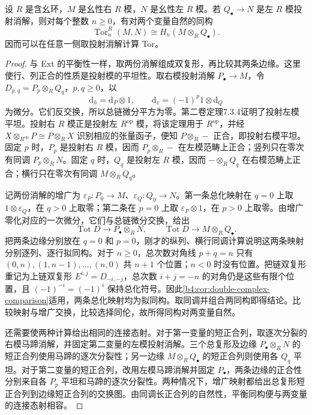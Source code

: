 \begin{theorem}\label{b4:thm:tor-balanced}
	设 \(R\) 是含幺环，\(M\) 是幺性右 \(R\) 模，\(N\) 是幺性左 \(R\) 模。若 \(Q_\bullet\to N\) 是左 \(R\) 模投射消解，则对每个整数 \(n\ge0\)，有对两个变量自然的同构
	\[
		\operatorname{Tor}_n^R(M,N)\cong H_n(M\otimes_RQ_\bullet).
	\]
	因而可以在任意一侧取投射消解计算 Tor。
\end{theorem}
\begin{proof}
	与 Ext 的平衡性一样，取两份消解组成双复形，再比较其两条边缘。这里使行、列正合的性质是投射模的平坦性。取右模投射消解 \(P_\bullet\to M\)，令 \(D_{p,q}=P_p\otimes_RQ_q\)，\(p,q\ge0\)，以
	\[
		\mathrm{d}_h=\mathrm{d}_P\otimes1,\qquad \mathrm{d}_v=(-1)^p1\otimes \mathrm{d}_Q
	\]
	为微分。它们反交换，所以总链微分平方为零。第二卷定理7.3.4证明了投射左模平坦。投射右 \(R\) 模正是投射左 \(R^{\mathrm{op}}\) 模，将该定理用于 \(R^{\mathrm{op}}\)，并经 \(X\otimes_{R^{\mathrm{op}}}P\cong P\otimes_RX\) 识别相应的张量函子，便知 \(P\otimes_R-\) 正合，即投射右模平坦。固定 \(p\) 时，\(P_p\) 是投射右 \(R\) 模，因而 \(P_p\otimes_R-\) 在左模范畴上正合；竖列只在零次有同调 \(P_p\otimes_RN\)。固定 \(q\) 时，\(Q_q\) 是投射左 \(R\) 模，因而 \(-\otimes_RQ_q\) 在右模范畴上正合；横行只在零次有同调 \(M\otimes_RQ_q\)。

	记两份消解的增广为 \(\varepsilon_P:P_0\to M\)、\(\varepsilon_Q:Q_0\to N\)。第一条总化映射在 \(q=0\) 上取 \(1\otimes\varepsilon_Q\)，在 \(q>0\) 上取零；第二条在 \(p=0\) 上取 \(\varepsilon_P\otimes1\)，在 \(p>0\) 上取零。由增广零化对应的一次微分，它们与总链微分交换，给出
	\[
		\operatorname{Tot}D\longrightarrow P_\bullet\otimes_RN, \qquad \operatorname{Tot}D\longrightarrow M\otimes_RQ_\bullet.
	\]
	把两条边缘分别放在 \(q=0\) 和 \(p=0\)，刚才的纵列、横行同调计算说明这两条映射分别逐列、逐行拟同构。对于 \(n\ge0\)，总次数对角线 \(p+q=n\) 只有 \((0,n),(1,n-1),\ldots,(n,0)\) 共 \(n+1\) 个位置；\(n<0\) 时没有位置。把链双复形重记为上链双复形 \(E^{i,j}=D_{-i,-j}\)，总次数 \(i+j=-n\) 的对角仍是这些有限个位置，且 \((-1)^{-i}=(-1)^i\) 保持总化符号。因此\cref{b4:cor:double-complex-comparison}适用，两条总化映射均为拟同构。取同调并组合两同构即得结论。比较映射与增广交换，比较选择同伦，故所得同构对两变量自然。

	还需要使两种计算给出相同的连接态射。对于第一变量的短正合列，取逐次分裂的右模马蹄消解，并固定第二变量的左模投射消解。三个总复形及边缘 \(P_\bullet\otimes_RN\) 的短正合列使用马蹄的逐次分裂性；另一边缘 \(M\otimes_RQ_\bullet\) 的短正合列则使用各 \(Q_q\) 平坦。对于第二变量的短正合列，改用左模马蹄消解并固定 \(P_\bullet\)，两条边缘的正合性分别来自各 \(P_p\) 平坦和马蹄的逐次分裂性。两种情况下，增广映射都给出总复形短正合列到边缘短正合列的交换图。由同调长正合列的自然性，平衡同构便与两变量的连接态射相容。
\end{proof}


